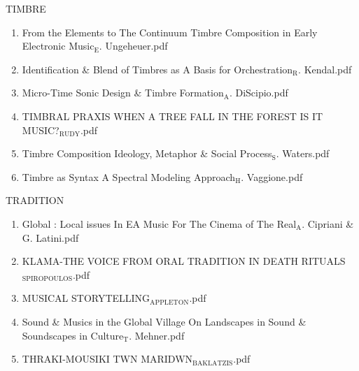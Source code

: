 \documentclass[11pt]{article}
\begin{document}
\item TIMBRE
\label{sec-1-1-1-1-49-1-36}
\begin{enumerate}
\item From the Elements to The Continuum Timbre Composition in Early Electronic Music$_{\text{E}}$. Ungeheuer.pdf
\label{sec-1-1-1-1-49-1-36-1}

\item Identification \& Blend of Timbres as A Basis for Orchestration$_{\text{R}}$. Kendal.pdf
\label{sec-1-1-1-1-49-1-36-2}

\item Micro-Time Sonic Design \& Timbre Formation$_{\text{A}}$. DiScipio.pdf
\label{sec-1-1-1-1-49-1-36-3}

\item TIMBRAL PRAXIS WHEN A TREE FALL IN THE FOREST IS IT MUSIC?$_{\text{RUDY}}$.pdf
\label{sec-1-1-1-1-49-1-36-4}

\item Timbre Composition Ideology, Metaphor \& Social Process$_{\text{S}}$. Waters.pdf
\label{sec-1-1-1-1-49-1-36-5}

\item Timbre as Syntax A Spectral Modeling Approach$_{\text{H}}$. Vaggione.pdf
\label{sec-1-1-1-1-49-1-36-6}
\end{enumerate}

\item TRADITION
\label{sec-1-1-1-1-49-1-37}
\begin{enumerate}
\item Global : Local issues In EA Music For The Cinema of The Real$_{\text{A}}$. Cipriani \& G. Latini.pdf
\label{sec-1-1-1-1-49-1-37-1}

\item KLAMA-THE VOICE FROM ORAL TRADITION IN DEATH RITUALS$_{\text{SPIROPOULOS}}$.pdf
\label{sec-1-1-1-1-49-1-37-2}

\item MUSICAL STORYTELLING$_{\text{APPLETON}}$.pdf
\label{sec-1-1-1-1-49-1-37-3}

\item Sound \& Musics in the Global Village On Landscapes in Sound \&  Soundscapes in Culture$_{\text{T}}$. Mehner.pdf
\label{sec-1-1-1-1-49-1-37-4}

\item THRAKI-MOUSIKI TWN MARIDWN$_{\text{BAKLATZIS}}$.pdf
\label{sec-1-1-1-1-49-1-37-5}
\end{enumerate}
\end{document}
